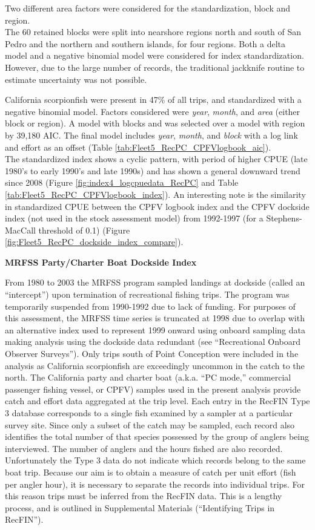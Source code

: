 \documentclass[12pt,]{article}
\begin{document}
Two different area factors were considered for the standardization,
block and region.\\
The 60 retained blocks were split into nearshore regions north and south
of San Pedro and the northern and southern islands, for four regions.
Both a delta model and a negative binomial model were considered for
index standardization. However, due to the large number of records, the
traditional jackknife routine to estimate uncertainty was not possible.

California scorpionfish were present in 47\% of all trips, and
standardized with a negative binomial model. Factors considered were
\emph{year}, \emph{month}, and \emph{area} (either block or region). A
model with blocks and was selected over a model with region by 39,180
AIC. The final model includes \emph{year}, \emph{month}, and
\emph{block} with a log link and effort as an offset (Table
\ref{tab:Fleet5_RecPC_CPFVlogbook_aic}).\\
The standardized index shows a cyclic pattern, with period of higher
CPUE (late 1980's to early 1990's and late 1990s) and has shown a
general downward trend since 2008 (Figure
\ref{fig:index4_logcpuedata_RecPC} and Table
\ref{tab:Fleet5_RecPC_CPFVlogbook_index}). An interesting note is the
similarity in standardized CPUE between the CPFV logbook index and the
CPFV dockside index (not used in the stock assessment model) from
1992-1997 (for a Stephens-MacCall threshold of 0.1) (Figure
\ref{fig:Fleet5_RecPC_dockside_index_compare}).

\textbf{MRFSS Party/Charter Boat Dockside Index}

From 1980 to 2003 the MRFSS program sampled landings at dockside (called
an ``intercept'') upon termination of recreational fishing trips. The
program was temporarily suspended from 1990-1992 due to lack of funding.
For purposes of this assessment, the MRFSS time series is truncated at
1998 due to overlap with an alternative index used to represent 1999
onward using onboard sampling data making analysis using the dockside
data redundant (see ``Recreational Onboard Observer Surveys''). Only
trips south of Point Conception were included in the analysis as
California scorpionfish are exceedingly uncommon in the catch to the
north. The California party and charter boat (a.k.a. ``PC mode,''
commercial passenger fishing vessel, or CPFV) samples used in the
present analysis provide catch and effort data aggregated at the trip
level. Each entry in the RecFIN Type 3 database corresponds to a single
fish examined by a sampler at a particular survey site. Since only a
subset of the catch may be sampled, each record also identifies the
total number of that species possessed by the group of anglers being
interviewed. The number of anglers and the hours fished are also
recorded. Unfortunately the Type 3 data do not indicate which records
belong to the same boat trip. Because our aim is to obtain a measure of
catch per unit effort (fish per angler hour), it is necessary to
separate the records into individual trips. For this reason trips must
be inferred from the RecFIN data. This is a lengthy process, and is
outlined in Supplemental Materials (``Identifying Trips in RecFIN'').
\end{document}
